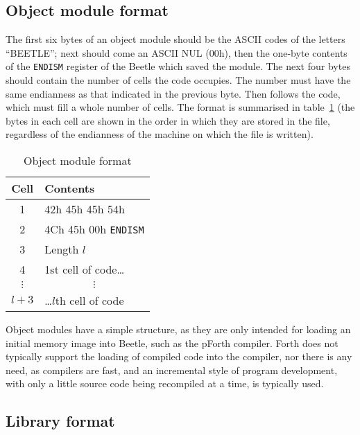 \documentclass{article}
\begin{document}
\subsection{Object module format}
\label{object}

The first six bytes of an object module should be the ASCII codes of the letters
``BEETLE''; next should come an ASCII NUL (00h), then the one-byte contents of
the {\tt ENDISM} register of the Beetle which saved the module. The next four
bytes should contain the number of cells the code occupies. The number must have
the same endianness as that indicated in the previous byte. Then follows the
code, which must fill a whole number of cells. The format is summarised in table~\ref{objecttable}
(the bytes in each cell are shown in the order in which they
are stored in the file, regardless of the endianness of the machine on which the
file is written).

\begin{table}[htbp]
\begin{center}
\begin{tabular}{|c|l|} \hline
\rule[-2mm]{0mm}{6mm}\bf Cell & \bf Contents \\ \hline
1 & 42h 45h 45h 54h \\ \hline
2 & 4Ch 45h 00h {\tt ENDISM} \\ \hline
3 & Length $l$\/ \\ \hline
4 & 1st cell of code\dots \\ \hline
$\vdots$ & \multicolumn{1}{c|}{$\vdots$} \\ \hline
$l+3$\/ & \dots$l$\/th cell of code \\ \hline
\end{tabular}
\end{center}
\vspace{-2mm}
\caption{\label{objecttable}Object module format}
\end{table}

Object modules have a simple structure, as they are only intended for loading an
initial memory image into Beetle, such as the pForth compiler. Forth does not
typically support the loading of compiled code into the compiler, nor there is
any need, as compilers are fast, and an incremental style of program
development, with only a little source code being recompiled at a time, is
typically used.


\subsection{Library format}
\end{document}
